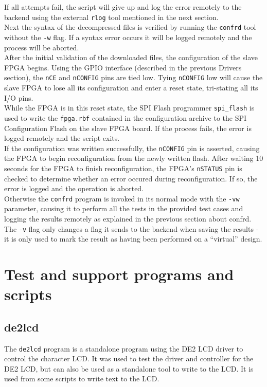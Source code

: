 If all attempts fail, the script will give up and log the error remotely to the backend using the
external \texttt{rlog} tool mentioned in the next section.
\\

Next the syntax of the decompressed files is verified by running the \texttt{confrd} tool
without the \texttt{-w} flag. If a syntax error occurs it will be logged remotely and the process
will be aborted.
\\

After the initial validation of the downloaded files, the configuration of the slave FPGA
begins. Using the GPIO interface (described in the previous Drivers section), the \texttt{nCE}
and \texttt{nCONFIG} pins are tied low. Tying \texttt{nCONFIG} low will cause the slave FPGA
to lose all its configuration and enter a reset state, tri-stating all its I/O pins.
\\

While the FPGA is in this reset state, the SPI Flash programmer \texttt{spi\_flash} is used
to write the \texttt{fpga.rbf} contained in the configuration archive to the SPI Configuration
Flash on the slave FPGA board. If the process fails, the error is logged remotely and the
script exits.
\\

If the configuration was written successfully, the \texttt{nCONFIG} pin is asserted, causing
the FPGA to begin reconfiguration from the newly written flash. After waiting 10 seconds
for the FPGA to finish reconfiguration, the FPGA's \texttt{nSTATUS} pin is checked to determine
whether an error occured during reconfiguration. If so, the error is logged and the operation
is aborted.
\\

Otherwise the \texttt{confrd} program is invoked in its normal mode with the \texttt{-vw} parameter,
causing it to perform all the tests in the provided test cases and logging the results remotely
as explained in the previous section about confrd. The \texttt{-v} flag only changes a flag it sends
to the backend when saving the results - it is only used to mark the result as having been performed
on a ``virtual'' design.


\newpage
\section{Test and support programs and scripts}
\subsection{de2lcd}
The \texttt{de2lcd} program is a standalone program using the DE2 LCD driver to control
the character LCD. It was used to test the driver and controller for the DE2 LCD, but
can also be used as a standalone tool to write to the LCD. It is used from some scripts
to write text to the LCD.


